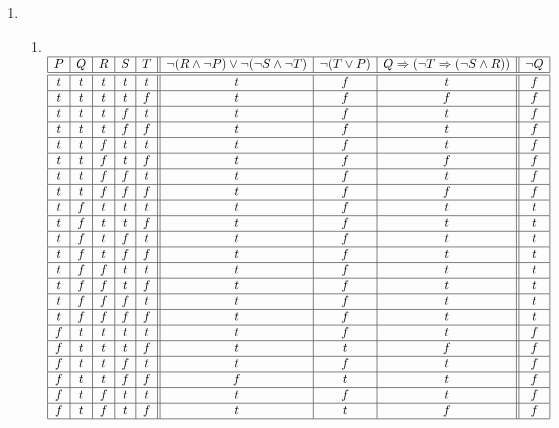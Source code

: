 \documentclass[10pt]{article}
\begin{document}
\begin{enumerate}
\item %
  \begin{enumerate}
  \item %
    \ \\
    \begin{math}
    \begin{array}{|c|c|c|c|c||c|c|c||c|}
      \hline
      P & Q & R & S & T
        & \neg (R \land \neg P) \lor \neg (\neg S \land \neg T) 
        & \neg (T \lor P)
        & Q \Rightarrow (\neg T \Rightarrow (\neg S \land R))
        & \neg Q \\
      \hline \hline
      t & t & t & t & t & t & f & t & f \\ \hline
      t & t & t & t & f & t & f & f & f \\ \hline
      t & t & t & f & t & t & f & t & f \\ \hline
      t & t & t & f & f & t & f & t & f \\ \hline
      t & t & f & t & t & t & f & t & f \\ \hline
      t & t & f & t & f & t & f & f & f \\ \hline
      t & t & f & f & t & t & f & t & f \\ \hline
      t & t & f & f & f & t & f & f & f \\ \hline
      t & f & t & t & t & t & f & t & t \\ \hline
      t & f & t & t & f & t & f & t & t \\ \hline
      t & f & t & f & t & t & f & t & t \\ \hline
      t & f & t & f & f & t & f & t & t \\ \hline
      t & f & f & t & t & t & f & t & t \\ \hline
      t & f & f & t & f & t & f & t & t \\ \hline
      t & f & f & f & t & t & f & t & t \\ \hline
      t & f & f & f & f & t & f & t & t \\ \hline
      f & t & t & t & t & t & f & t & f \\ \hline
      f & t & t & t & f & t & t & f & f \\ \hline
      f & t & t & f & t & t & f & t & f \\ \hline
      f & t & t & f & f & f & t & t & f \\ \hline
      f & t & f & t & t & t & f & t & f \\ \hline
      f & t & f & t & f & t & t & f & f \\ \hline

\end{array}
\end{math}
\end{enumerate}
\end{enumerate}
\end{document}
